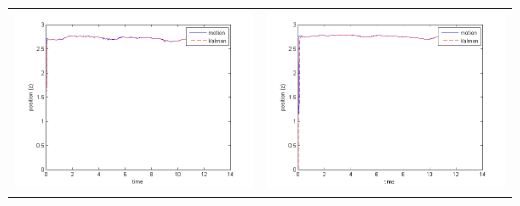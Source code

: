 \documentclass[8pt,sans,mathserif]{beamer}%
\begin{document}
\begin{frame}
\begin{columns}
\begin{tabular}{cc}
            \includegraphics[height = 0.23\textheight, keepaspectratio]{fig/filter0-z.png} & \includegraphics[height = 0.23\textheight, keepaspectratio]{fig/filter3-z.png}\\

\end{tabular}
\end{columns}
\end{frame}
\end{document}
